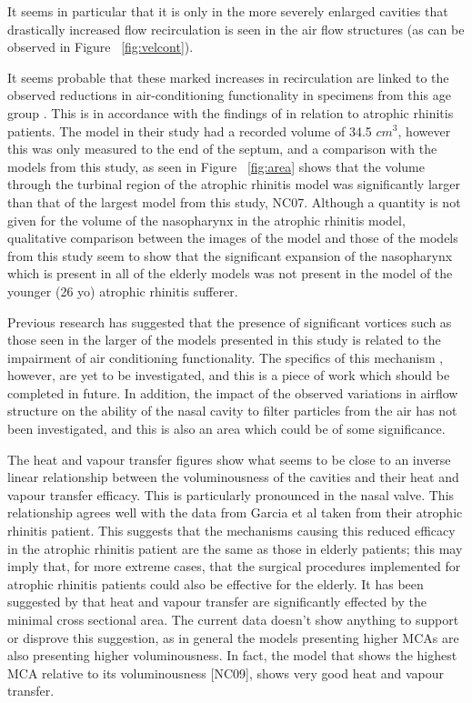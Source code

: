 It seems in particular that it is only in the more severely enlarged cavities that drastically increased flow recirculation is seen in the air flow structures (as can be observed in Figure ~\ref{fig:velcont}).

It seems probable that these marked increases in recirculation are linked to the observed reductions in air-conditioning functionality in specimens from this age group \cite{Lindemann2009a}. This is in accordance with the findings of \cite{Garcia2007} in relation to atrophic rhinitis patients. The model in their study had a recorded volume of 34.5 $cm^3$, however this was only measured to the end of the septum, and a comparison with the models from this study, as seen in Figure ~\ref{fig:area} shows that the volume through the turbinal region of the atrophic rhinitis model was significantly larger than that of the largest model from this study, NC07. Although a quantity is not given for the volume of the nasopharynx in the atrophic rhinitis model, qualitative comparison between the  images of the model and those of the models from this study seem to show that the significant expansion of the nasopharynx which is present in all of the elderly models was not present in the model of the younger (26 yo) atrophic rhinitis sufferer. 

Previous research has suggested that the presence of significant vortices such as those seen in the larger of the models presented in this study is related to the impairment of air conditioning functionality. The specifics of this mechanism , however, are yet to be investigated, and this is a piece of work which should be completed in future. In addition, the impact of the observed variations in airflow structure on the ability of the nasal cavity to filter particles from the air has not been investigated, and this is also an area which could be of some significance.

The heat and vapour transfer figures show what seems to be close to an inverse linear relationship between the voluminousness of the cavities and their heat and vapour transfer efficacy. This is particularly pronounced in the nasal valve. This relationship agrees well with the data from Garcia et al \cite{Garcia2007} taken from their atrophic rhinitis patient. This suggests that the mechanisms causing this reduced efficacy in the atrophic rhinitis patient are the same as those in elderly patients; this may imply that, for more extreme cases, that the surgical procedures implemented for atrophic rhinitis patients could also be effective for the elderly. It has been suggested by \cite{Lindemann2008} that heat and vapour transfer are significantly effected by the minimal cross sectional area. The current data doesn't show anything to support or disprove this suggestion, as in general the models presenting higher MCAs are also presenting higher voluminousness. In fact, the model that shows the highest MCA relative to its voluminousness [NC09], shows very good heat and vapour transfer.

